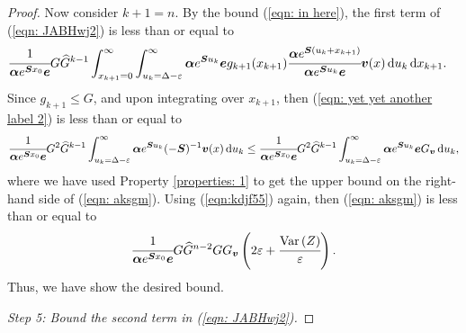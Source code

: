 \begin{proof}
		Now consider \(k+1=n\). By the bound (\ref{eqn: in here}), the first term of (\ref{eqn: JABHwj2}) is less than or equal to 
		\begin{align}
			&\cfrac{1}{\boldsymbol \alpha e^{\boldsymbol{S} x_0 }\boldsymbol e}G \widehat G^{k-1}
			\int_{x_{k+1}=0}^\infty \int_{u_k=\Delta-\varepsilon}^\infty \boldsymbol \alpha e^{\boldsymbol{S}u_k}\boldsymbol e g_{k+1}(x_{k+1}) \cfrac{\boldsymbol\alpha e^{\boldsymbol{S}(u_k+x_{k+1})}}{\boldsymbol \alpha e^{\boldsymbol{S}u_k}\boldsymbol e}\boldsymbol v(x)\, \mathrm{d} u_k \, \mathrm{d} x_{k+1}. \label{eqn: yet yet another label 2}
			\end{align}
			{Since \(g_{k+1}\leq G\), and upon integrating over \(x_{k+1}\), then (\ref{eqn: yet yet another label 2}) is less than or equal to }
			\begin{align}
			 \cfrac{1}{\boldsymbol \alpha e^{\boldsymbol{S} x_0 }\boldsymbol e}G^2\widehat G^{k-1}  
			\int_{u_k=\Delta-\varepsilon}^\infty \boldsymbol\alpha e^{\boldsymbol{S}u_k}(-\boldsymbol S)^{-1}{\boldsymbol v}(x) \, \mathrm{d} u_k 
			\leq \cfrac{1}{\boldsymbol \alpha e^{\boldsymbol{S} x_0 }\boldsymbol e}G^2 \widehat G^{k-1}  
			\int_{u_k=\Delta-\varepsilon}^\infty  \boldsymbol \alpha e^{\boldsymbol S u_k} \boldsymbol e G_{\boldsymbol v} \, \mathrm{d} u_k , \label{eqn: aksgm}
		\end{align}
		where we have used Property \ref{properties: 1} to get the upper bound on the right-hand side of (\ref{eqn: aksgm}). Using (\ref{eqn:kdjf55}) again, then (\ref{eqn: aksgm}) is less than or equal to
		\begin{align}
			\cfrac{1}{\boldsymbol \alpha e^{\boldsymbol{S} x_0 }\boldsymbol e}G\widehat G^{n-2}   G G_{\boldsymbol v}\left(2\varepsilon + \cfrac{\mathrm{Var}\left(Z\right)}{\varepsilon}\right).
		\end{align}
		Thus, we have show the desired bound. 






\emph{Step 5: Bound the second term in (\ref{eqn: JABHwj2}).}


\end{proof}
